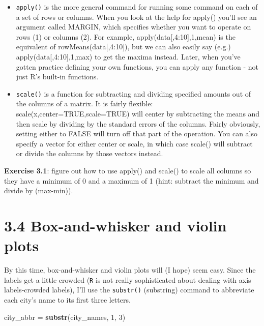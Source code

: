 \documentclass[11pt,]{article}
\newenvironment{Shaded}{\begin{snugshade}}{\end{snugshade}}
\newcommand{\KeywordTok}[1]{\textcolor[rgb]{0.13,0.29,0.53}{\textbf{#1}}}
\newcommand{\DecValTok}[1]{\textcolor[rgb]{0.00,0.00,0.81}{#1}}
\newcommand{\StringTok}[1]{\textcolor[rgb]{0.31,0.60,0.02}{#1}}
\newcommand{\NormalTok}[1]{#1}
\begin{document}
\begin{itemize}
\item
  \texttt{apply()} is the more general command for running some command
  on each of a set of rows or columns. When you look at the help for
  apply() you'll see an argument called MARGIN, which specifies whether
  you want to operate on rows (1) or columns (2). For example,
  apply(data{[},4:10{]},1,mean) is the equivalent of
  rowMeans(data{[},4:10{]}), but we can also easily say (e.g.)
  apply(data{[},4:10{]},1,max) to get the maxima instead. Later, when
  you've gotten practice defining your own functions, you can apply any
  function - not just R's built-in functions.
\item
  \texttt{scale()} is a function for subtracting and dividing specified
  amounts out of the columns of a matrix. It is fairly flexible:
  scale(x,center=TRUE,scale=TRUE) will center by subtracting the means
  and then scale by dividing by the standard errors of the columns.
  Fairly obviously, setting either to FALSE will turn off that part of
  the operation. You can also specify a vector for either center or
  scale, in which case scale() will subtract or divide the columns by
  those vectors instead.
\end{itemize}

\textbf{Exercise 3.1}: figure out how to use apply() and scale() to
scale all columns so they have a minimum of 0 and a maximum of 1 (hint:
subtract the minimum and divide by (max-min)).

\section{3.4 Box-and-whisker and violin
plots}\label{box-and-whisker-and-violin-plots}

By this time, box-and-whisker and violin plots will (I hope) seem easy.
Since the labels get a little crowded (\texttt{R} is not really
sophisticated about dealing with axis labels-crowded labels), I'll use
the \texttt{substr()} (substring) command to abbreviate each city's name
to its first three letters.

\begin{Shaded}
\begin{Highlighting}[]
\NormalTok{city_abbr =}\StringTok{ }\KeywordTok{substr}\NormalTok{(city_names, }\DecValTok{1}\NormalTok{, }\DecValTok{3}\NormalTok{)}
\end{Highlighting}
\end{Shaded}
\end{document}
